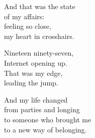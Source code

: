 \begin{lyrics}
And that was the state\\
of my affairs:\\
feeling so close,\\
my heart in crosshairs.

Nineteen ninety-seven,\\
Internet opening up.\\
That was my edge,\\
leading the jump.

And my life changed\\
from parties and longing\\
to someone who brought me\\
to a new way of belonging.
\end{lyrics}

